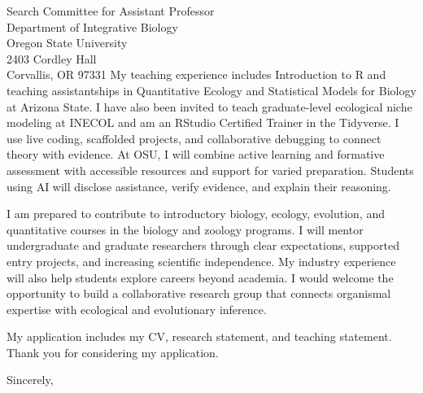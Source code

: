 \documentclass[11pt,letterpaper]{letter}
\begin{document}
\begin{letter}{
Search Committee for Assistant Professor\\
Department of Integrative Biology\\
Oregon State University\\
2403 Cordley Hall\\
Corvallis, OR 97331
}
My teaching experience includes Introduction to R and teaching assistantships in Quantitative Ecology and Statistical Models for Biology at Arizona State. I have also been invited to teach graduate-level ecological niche modeling at INECOL and am an RStudio Certified Trainer in the Tidyverse. I use live coding, scaffolded projects, and collaborative debugging to connect theory with evidence. At OSU, I will combine active learning and formative assessment with accessible resources and support for varied preparation. Students using AI will disclose assistance, verify evidence, and explain their reasoning.

I am prepared to contribute to introductory biology, ecology, evolution, and quantitative courses in the biology and zoology programs. I will mentor undergraduate and graduate researchers through clear expectations, supported entry projects, and increasing scientific independence. My industry experience will also help students explore careers beyond academia. I would welcome the opportunity to build a collaborative research group that connects organismal expertise with ecological and evolutionary inference.

My application includes my CV, research statement, and teaching statement. Thank you for considering my application.

\closing{Sincerely,}
\end{letter}
\end{document}
